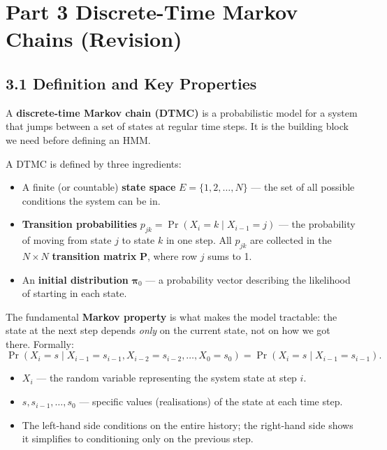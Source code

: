 \documentclass[12pt, a4paper]{article}
\begin{document}
\section*{Part 3 \quad Discrete-Time Markov Chains (Revision)}

\subsection*{3.1 \quad Definition and Key Properties}

A \textbf{discrete-time Markov chain (DTMC)} is a probabilistic model for a
system that jumps between a set of states at regular time steps. It is the
building block we need before defining an HMM.

A DTMC is defined by three ingredients:
\begin{itemize}[leftmargin=1.4em, itemsep=3pt]
  \item A finite (or countable) \textbf{state space} $E = \{1, 2, \ldots, N\}$
    --- the set of all possible conditions the system can be in.
  \item \textbf{Transition probabilities} $p_{jk} = \Pr(X_{i} = k \mid X_{i-1} = j)$
    --- the probability of moving from state $j$ to state $k$ in one step.
    All $p_{jk}$ are collected in the $N \times N$ \textbf{transition matrix}
    $\mathbf{P}$, where row $j$ sums to 1.
  \item An \textbf{initial distribution} $\boldsymbol{\pi}_0$ --- a probability
    vector describing the likelihood of starting in each state.
\end{itemize}

The fundamental \textbf{Markov property} is what makes the model tractable:
the state at the next step depends \emph{only} on the current state, not on
how we got there. Formally:
\[
  \Pr(X_i = s \mid X_{i-1} = s_{i-1}, X_{i-2} = s_{i-2}, \ldots, X_0 = s_0)
  = \Pr(X_i = s \mid X_{i-1} = s_{i-1}).
\]
\begin{itemize}[leftmargin=1.4em, itemsep=2pt]
  \item $X_i$ --- the random variable representing the system state at step $i$.
  \item $s, s_{i-1}, \ldots, s_0$ --- specific values (realisations) of the
    state at each time step.
  \item The left-hand side conditions on the entire history; the right-hand side
    shows it simplifies to conditioning only on the previous step.
\end{itemize}
\end{document}
